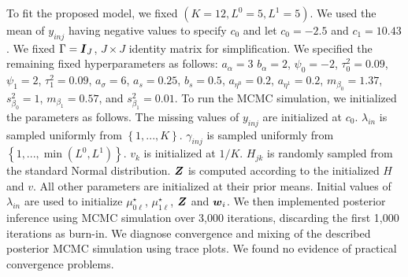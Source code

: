 \documentclass[12pt,]{article}
\newcommand{\bc}[1]{ \left\{#1\right\} }
\newcommand{\bZ}{\mbox{\boldmath $Z$}}
\newcommand{\bw}{\mbox{\boldmath $w$}}
\newcommand{\bI}{\mbox{\boldmath $I$}}
\begin{document}
To fit the proposed model, we fixed $(K=12, L^0=5,
L^1=5)$. We used the mean of $y_{inj}$  having negative values to specify $c_0$
and let $c_0=-2.5$ and $c_1=10.43$. We fixed $\Gamma=\bI_J$,
$J\times J$ identity matrix for simplification. We specified the remaining fixed
hyperparameters as follows:
%
$a_\alpha=3$ $b_\alpha=2$, $\psi_0=-2$, $\tau^2_0=0.09$, $\psi_1=2$,
$\tau^2_1=0.09$, $a_\sigma=6$, $a_s=0.25$, $b_s=0.5$, $a_{\eta^0}=0.2$,
$a_{\eta^1}=0.2$, $m_{\beta_0}=1.37$, $s^2_{\beta_0}=1$,
$m_{\beta_1}=0.57$, and $s^2_{\beta_1}=0.01$.
%
To run the MCMC simulation, we initialized the parameters as follows. The
missing values of $y_{inj}$ are initialized at $c_0$.  $\lambda_{in}$ is
sampled uniformly from $\bc{1,...,K}$.  $\gamma_{inj}$ is sampled uniformly
from $\bc{1,...,\min(L^0,L^1)}$. $v_k$ is initialized at $1/K$. $H_{jk}$ is
randomly sampled from the standard Normal distribution.  $\bZ$ is computed
according to the initialized $H$ and $v$. All other parameters are initialized
at their prior means.  Initial values of $\lambda_{in}$ are used to initialize
$\mu^{\star}_{0\ell}$, $\mu^{\star}_{1\ell}$, $\bZ$ and $\bw_i$.  We then
implemented posterior inference using MCMC simulation over 3,000 iterations,
discarding the first 1,000 iterations as burn-in.  We diagnose convergence and
mixing of the described posterior MCMC simulation using trace plots. We found
no evidence of practical convergence problems. 
\end{document}
